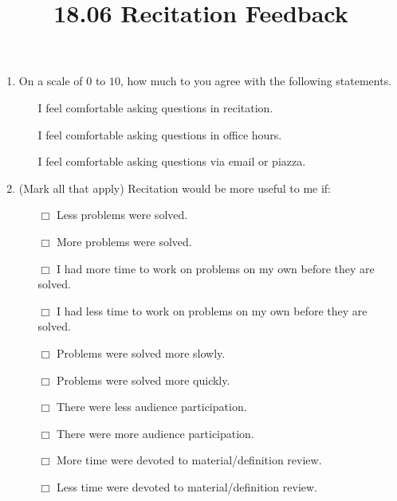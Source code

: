 \documentclass[12pt]{amsart}
\title{18.06 Recitation Feedback}
\begin{document}
\maketitle
\thispagestyle{empty}
\begin{enumerate}

\item On a scale of $0$ to $10$, how much to you agree with the following statements.
\vspace{10pt}
\begin{itemize}
\item[\underline{\phantom{aaaaa}}] I feel comfortable asking questions in recitation.
\vspace{5pt}
\item[\underline{\phantom{aaaaa}}] I feel comfortable asking questions in office hours.
\vspace{5pt}
\item[\underline{\phantom{aaaaa}}] I feel comfortable asking questions via email or piazza.
\end{itemize}

\vspace{10pt}

\item (Mark all that apply) Recitation would be more useful to me if:
\begin{itemize}
\item[$\Box$] Less problems were solved.
\vspace{5pt}
\item[$\Box$] More problems were solved.
\vspace{5pt}
\item[$\Box$] I had more time to work on problems on my own before they are solved.
\vspace{5pt}
\item[$\Box$] I had less time to work on problems on my own before they are solved.
\vspace{5pt}
\item[$\Box$] Problems were solved more slowly.
\vspace{5pt}
\item[$\Box$] Problems were solved more quickly.
\vspace{5pt}
\item[$\Box$] There were less audience participation.
\vspace{5pt}
\item[$\Box$] There were more audience participation.
\vspace{5pt}
\item[$\Box$] More time were devoted to material/definition review.
\vspace{5pt}
\item[$\Box$] Less time were devoted to material/definition review.
\end{itemize}


\end{enumerate}
\end{document}
